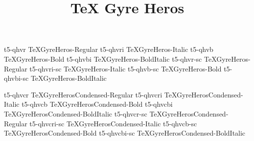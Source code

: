 \documentclass[test]{vnsample}
\title{TeX Gyre Heros}
\begin{document}
\begin{shortsample}
    {t5-qhvr}     {TeXGyreHeros-Regular}
   {t5-qhvri}    {TeXGyreHeros-Italic}
    {t5-qhvb}     {TeXGyreHeros-Bold}
   {t5-qhvbi}    {TeXGyreHeros-BoldItalic}
   {t5-qhvr-sc}  {TeXGyreHeros-Regular}
 {t5-qhvri-sc} {TeXGyreHeros-Italic}
   {t5-qhvb-sc}  {TeXGyreHeros-Bold}
 {t5-qhvbi-sc} {TeXGyreHeros-BoldItalic}

     {t5-qhvcr}     {TeXGyreHerosCondensed-Regular}
    {t5-qhvcri}    {TeXGyreHerosCondensed-Italic}
    {t5-qhvcb}     {TeXGyreHerosCondensed-Bold}
   {t5-qhvcbi}    {TeXGyreHerosCondensed-BoldItalic}
    {t5-qhvcr-sc}  {TeXGyreHerosCondensed-Regular}
  {t5-qhvcri-sc} {TeXGyreHerosCondensed-Italic}
   {t5-qhvcb-sc}  {TeXGyreHerosCondensed-Bold}
 {t5-qhvcbi-sc} {TeXGyreHerosCondensed-BoldItalic}
\end{shortsample}
\end{document}
